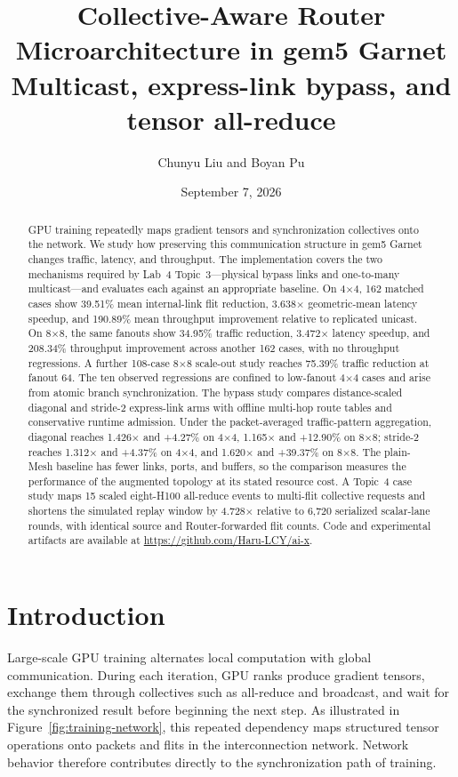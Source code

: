 \documentclass[10pt]{article}
\title{Collective-Aware Router Microarchitecture in gem5 Garnet\\
\large Multicast, express-link bypass, and tensor all-reduce}
\author{Chunyu Liu and Boyan Pu}
\date{September 7, 2026}
\begin{document}
\maketitle

\begin{abstract}
GPU training repeatedly maps gradient tensors and synchronization collectives
onto the network.  We study how preserving this communication structure in
gem5 Garnet changes traffic, latency, and throughput.  The implementation
covers the two mechanisms required by Lab~4 Topic~3---physical bypass links and
one-to-many multicast---and evaluates each against an appropriate baseline.
On 4$\times$4, 162 matched cases show 39.51\% mean internal-link flit
reduction, 3.638$\times$ geometric-mean latency speedup, and 190.89\% mean
throughput improvement relative to replicated unicast.  On 8$\times$8, the
same fanouts show 34.95\% traffic reduction, 3.472$\times$ latency speedup, and
208.34\% throughput improvement across another 162 cases, with no throughput
regressions.  A further 108-case 8$\times$8 scale-out study reaches 75.39\%
traffic reduction at fanout 64.  The ten observed regressions are confined to
low-fanout 4$\times$4 cases and arise from atomic branch synchronization.
The bypass study compares distance-scaled diagonal and stride-2 express-link
arms with offline multi-hop route tables and conservative runtime admission.
Under the packet-averaged traffic-pattern aggregation, diagonal reaches
1.426$\times$ and +4.27\% on 4$\times$4,
1.165$\times$ and +12.90\% on 8$\times$8; stride-2 reaches 1.312$\times$
and +4.37\% on 4$\times$4, and 1.620$\times$ and +39.37\% on 8$\times$8.
The plain-Mesh baseline has fewer links, ports, and buffers, so the comparison
measures the performance of the augmented topology at its stated resource
cost.  A Topic~4 case study maps 15 scaled eight-H100 all-reduce events to
multi-flit collective requests and shortens the simulated replay window by
4.728$\times$ relative to 6,720 serialized scalar-lane rounds, with identical
source and Router-forwarded flit counts.
Code and experimental artifacts are available at
\url{https://github.com/Haru-LCY/ai-x}.
\end{abstract}

\section{Introduction}

Large-scale GPU training alternates local computation with global
communication.  During each iteration, GPU ranks produce gradient tensors,
exchange them through collectives such as all-reduce and broadcast, and wait
for the synchronized result before beginning the next step.  As illustrated in
Figure~\ref{fig:training-network}, this repeated dependency maps structured
tensor operations onto packets and flits in the interconnection network.
Network behavior therefore contributes directly to the synchronization path
of training.
\end{document}
